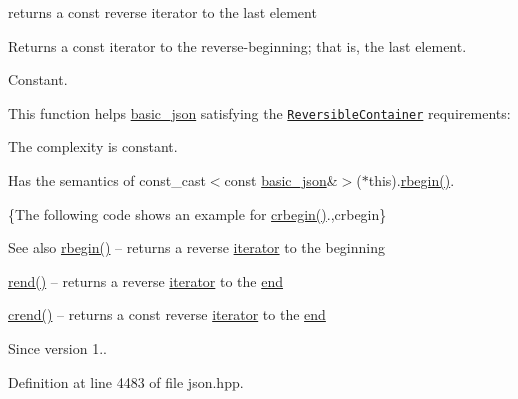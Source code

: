 returns a const reverse iterator to the last element 

Returns a const iterator to the reverse-\/beginning; that is, the last element.

  Constant.

This function helps {\ttfamily \hyperlink{classnlohmann_1_1basic__json}{basic\+\_\+json}} satisfying the \href{http://en.cppreference.com/w/cpp/concept/ReversibleContainer}{\tt Reversible\+Container} requirements\+:
\begin{DoxyItemize}
\item The complexity is constant.
\item Has the semantics of {\ttfamily const\+\_\+cast$<$const \hyperlink{classnlohmann_1_1basic__json}{basic\+\_\+json}\&$>$($\ast$this).\hyperlink{classnlohmann_1_1basic__json_a62ccf5b9b3674aec2403fbc02da03db8}{rbegin()}}.
\end{DoxyItemize}

\{The following code shows an example for {\ttfamily \hyperlink{classnlohmann_1_1basic__json_a43c08a393368eb674d0dcdbe301aafe3}{crbegin()}}.,crbegin\}

\begin{DoxySeeAlso}{See also}
\hyperlink{classnlohmann_1_1basic__json_a62ccf5b9b3674aec2403fbc02da03db8}{rbegin()} -- returns a reverse \hyperlink{classnlohmann_1_1basic__json_ae3c77a8f03096da2a32a3de0c317d445}{iterator} to the beginning 

\hyperlink{classnlohmann_1_1basic__json_aaa160a960dd3dd90856a72b1d8dbe707}{rend()} -- returns a reverse \hyperlink{classnlohmann_1_1basic__json_ae3c77a8f03096da2a32a3de0c317d445}{iterator} to the \hyperlink{classnlohmann_1_1basic__json_a12ccf14d39ddae52f6c7e126105a230b}{end} 

\hyperlink{classnlohmann_1_1basic__json_aae7eb3b91d7f68e86396c5c6b683445f}{crend()} -- returns a const reverse \hyperlink{classnlohmann_1_1basic__json_ae3c77a8f03096da2a32a3de0c317d445}{iterator} to the \hyperlink{classnlohmann_1_1basic__json_a12ccf14d39ddae52f6c7e126105a230b}{end}
\end{DoxySeeAlso}
\begin{DoxySince}{Since}
version 1.. 
\end{DoxySince}


Definition at line 4483 of file json.\+hpp.

\hypertarget{classnlohmann_1_1basic__json_aaa160a960dd3dd90856a72b1d8dbe707}{}
